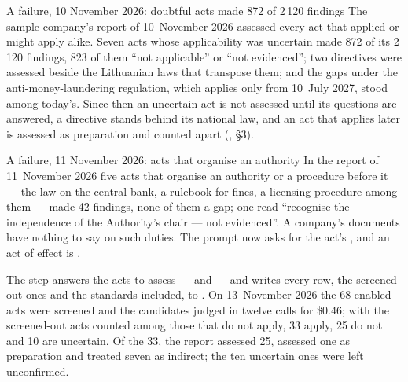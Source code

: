 \begin{lessonbox}{A failure, 10 November 2026: doubtful acts made 872 of 2\,120 findings}
The sample company's report of 10~November 2026 assessed every act that applied or might apply
alike. Seven acts whose applicability was uncertain made 872 of its 2\,120 findings, 823 of
them \enquote{not applicable} or \enquote{not evidenced}; two directives were assessed beside
the Lithuanian laws that transpose them; and the gaps under the anti-money-laundering
regulation, which applies only from 10~July 2027, stood among today's. Since then an uncertain
act is not assessed until its questions are answered, a directive stands behind its national
law, and an act that applies later is assessed as preparation and counted apart
(, §3).
\end{lessonbox}

\begin{lessonbox}{A failure, 11 November 2026: acts that organise an authority}
In the report of 11~November 2026 five acts that organise an authority or a procedure before
it --- the law on the central bank, a rulebook for fines, a licensing procedure among them ---
made 42 findings, none of them a gap; one read \enquote{recognise the independence of the
Authority's chair --- not evidenced}. A company's documents have nothing to say on such duties.
The prompt now asks for the act's , and an act of effect  is
.
\end{lessonbox}

The step answers the acts to assess ---  and  --- and writes
every row, the screened-out ones and the standards included, to . On
13~November 2026 the 68 enabled acts were screened and the candidates judged in twelve calls
for \$0.46; with the screened-out acts counted among those that do not apply, 33 apply, 25 do
not and 10 are uncertain. Of the 33, the report assessed 25, assessed one as
preparation and treated seven as indirect; the ten uncertain ones were left unconfirmed.

